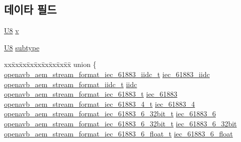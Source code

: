 \subsection*{데이타 필드}
\begin{DoxyCompactItemize}
\item 
\hyperlink{openavb__types__base__pub_8h_aa63ef7b996d5487ce35a5a66601f3e73}{U8} \hyperlink{structopenavb__aem__stream__format__t_aa2e280b5ed1972cee1efa1e710dcab29}{v}
\item 
\hyperlink{openavb__types__base__pub_8h_aa63ef7b996d5487ce35a5a66601f3e73}{U8} \hyperlink{structopenavb__aem__stream__format__t_ad61c2796f8f447c2ca8979f4aeccf351}{subtype}
\item 
\begin{tabbing}
xx\=xx\=xx\=xx\=xx\=xx\=xx\=xx\=xx\=\kill
union \{\\
\>\hyperlink{structopenavb__aem__stream__format__iec__61883__iidc__t}{openavb\_aem\_stream\_format\_iec\_61883\_iidc\_t} \hyperlink{structopenavb__aem__stream__format__t_a324ea780c70afdd2faeb952c4fe87e8a}{iec\_61883\_iidc}\\
\>\hyperlink{structopenavb__aem__stream__format__iidc__t}{openavb\_aem\_stream\_format\_iidc\_t} \hyperlink{structopenavb__aem__stream__format__t_a76a8f8589497242d711224afa0e571f7}{iidc}\\
\>\hyperlink{structopenavb__aem__stream__format__iec__61883__t}{openavb\_aem\_stream\_format\_iec\_61883\_t} \hyperlink{structopenavb__aem__stream__format__t_ac9a4d19d5fa896d5117129e89f84a4a5}{iec\_61883}\\
\>\hyperlink{structopenavb__aem__stream__format__iec__61883__4__t}{openavb\_aem\_stream\_format\_iec\_61883\_4\_t} \hyperlink{structopenavb__aem__stream__format__t_a318257cbc709e270e5b0f29802bf0749}{iec\_61883\_4}\\
\>\hyperlink{structopenavb__aem__stream__format__iec__61883__6__32bit__t}{openavb\_aem\_stream\_format\_iec\_61883\_6\_32bit\_t} \hyperlink{structopenavb__aem__stream__format__t_aa84d8df1d25684331e960ff5efa6f989}{iec\_61883\_6}\\
\>\hyperlink{structopenavb__aem__stream__format__iec__61883__6__32bit__t}{openavb\_aem\_stream\_format\_iec\_61883\_6\_32bit\_t} \hyperlink{structopenavb__aem__stream__format__t_a3cebb8eb67da31ee846bd30b5642e3d9}{iec\_61883\_6\_32bit}\\
\>\hyperlink{structopenavb__aem__stream__format__iec__61883__6__float__t}{openavb\_aem\_stream\_format\_iec\_61883\_6\_float\_t} \hyperlink{structopenavb__aem__stream__format__t_a35b108bee1c4afd810e21ea1141a5e8b}{iec\_61883\_6\_float}\\

\end{tabbing}
\end{DoxyCompactItemize}
